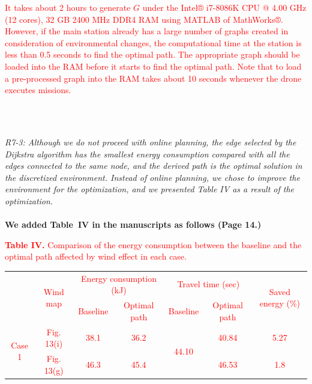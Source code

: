 \documentclass[onecolumn]{IEEEconf}
\begin{document}
\begin{description}
\begin{mdframed}[ linewidth=.75pt, userdefinedwidth=0.9\textwidth]
    \textcolor{red}{It takes about 2 hours to generate $G$ under the Intel® i7-8086K CPU @ 4.00 GHz (12 cores), 32 GB 2400 MHz DDR4 RAM using MATLAB of MathWorks®. 
    However, if the main station already has a large number of graphs created in consideration of environmental changes, the computational time at the station is less than 0.5 seconds to find the optimal path. The appropriate graph should be loaded into the RAM before it starts to find the optimal path. Note that to load a pre-processed graph into the RAM takes about 10 seconds whenever the drone executes missions.
    }
    \end{mdframed} 
    ~\\
    ~\\
	\item \textit
	{
	R7-3: Although we do not proceed with online planning, the edge selected by the Dijkstra algorithm has the smallest energy consumption compared with all the edges connected to the same node, and the derived path is the optimal solution in the discretized environment.
    Instead of online planning, we chose to improve the environment for the optimization, and we presented Table IV as a result of the optimization. 
	}
	~\\
	~\\
	\textbf{We added Table~IV in the manuscripts as follows (Page 14.)}\\
    \begin{mdframed}[ linewidth=.75pt, userdefinedwidth=0.9\textwidth]
    \textcolor{red}{\textbf{Table IV.} Comparison of the energy consumption between the baseline and the optimal path affected by wind effect in each case.}   
    \centering
    \label{tab: opt.result}
    \textcolor{red}{
    \begin{tabular}{|c|c|c|c|c|c|c|}
    \hline
    \multirow{2}{*}{} & \multirow{2}{*}{Wind map} & \multicolumn{2}{c|}{Energy consumption (kJ)} & \multicolumn{2}{c|}{Travel time (sec)} & \multirow{2}{*}{Saved energy (\%)} \\ \cline{3-6}
                        &            & Baseline & Optimal path & Baseline               & Optimal path &      \\ \hline
    \multirow{2}{*}{Case 1} & Fig. 13(i) & 38.1     & 36.2         & \multirow{2}{*}{44.10} & 40.84        & 5.27 \\ \cline{2-4} \cline{6-7} 
                        & Fig. 13(g) & 46.3     & 45.4         &                        & 46.53        & 1.8  \\ \hline

\end{tabular}}
\end{mdframed}
\end{description}
\end{document}
